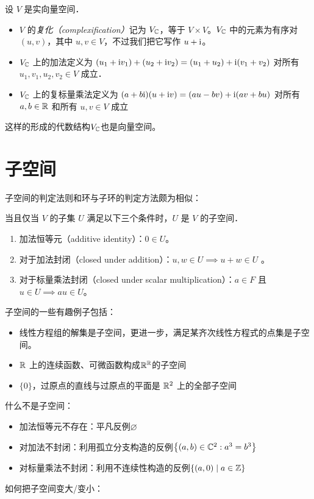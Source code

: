\begin{definition}[实向量空间的复化]
    设 \(V\) 是实向量空间．
    \begin{itemize}
        \item \(V\) 的\emph{复化（complexification）}记为
            \(V_{\mathbb{C}}\)，等于 \(V \times
            V\)。\(V_{\mathbb{C}}\)
            中的元素为有序对 \((u, v)\)，其中
            \(u, v \in V\)，不过我们把它写作 \(u + \mathrm{i} \)。
        \item \(V_{\mathbb{C}}\) 上的加法定义为
            \((u_1 + \mathrm{i} v_1) + (u_2 + \mathrm{i} v_2) = (u_1 +
            u_2) + \mathrm{i} (v_1 + v_2)\)
            对所有 \(u_1, v_1, u_2, v_2 \in V\) 成立．
        \item \(V_{\mathbb{C}}\) 上的复标量乘法定义为
            \((a + b\mathrm{i}) (u + \mathrm{i} v) =
                (au - bv) +
            \mathrm{i} (av + bu)\)
            对所有 \(a, b \in \mathbb{R}\) 和所有 \(u, v \in V\) 成立
    \end{itemize}
\end{definition}
这样的形成的代数结构\(V_{\mathbb{C}}\)也是向量空间。

\section{子空间}
子空间的判定法则和环与子环的判定方法颇为相似：
\begin{theorem}[子空间的条件]
    当且仅当 \(V\) 的子集 \(U\) 满足以下三个条件时，\(U\) 是 \(V\) 的子空间．
    \begin{enumerate}
        \item 加法恒等元（additive identity）：\(0 \in U\)。
        \item 对于加法封闭（closed under addition）：\(u, w \in U \implies u +
            w \in U\) 。
        \item 对于标量乘法封闭（closed under scalar
            multiplication）：\(a \in F\)  且 \(u \in U \implies au \in U\)。
    \end{enumerate}
\end{theorem}
子空间的一些有趣例子包括：
\begin{itemize}
    \item 线性方程组的解集是子空间，更进一步，满足某齐次线性方程式的点集是子空间。
    \item \(\mathbb{R}\)
        上的连续函数、可微函数构成\(\mathbb{R}^{\mathbb{R}}\)的子空间
    \item \(\{0\}\)，过原点的直线与过原点的平面是 \(\mathbb{R}^{2}\) 上的全部子空间
\end{itemize}
什么不是子空间：
\begin{itemize}\label{item:subspace counterexample}
    \item 加法恒等元不存在：平凡反例\(\varnothing\)
    \item 对加法不封闭：利用孤立分支构造的反例\(\left\{ (a,b)\in
        \mathbb{C}^{2}: a^{3}=b^{3}\right\}\)
    \item 对标量乘法不封闭：利用不连续性构造的反例\(\left\{(a,0)\mid a\in
        \mathbb{Z}\right\}\)
\end{itemize}

如何把子空间变大/变小：
